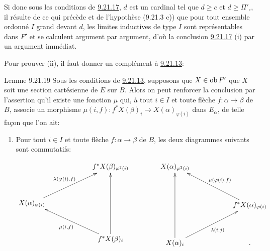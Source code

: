 \documentclass[10pt]{../fichiers-configuration-latex/smfart}
\def\labelenumi{(\theenumi)}
\begin{document}
Si donc sous les conditions de \hyperref[I.lem9.21.17]{9.21.17}, $d$ est un cardinal tel que
$d\geq c$ et $d\geq \Pi'_{\circ}$, il résulte de ce qui précède et
de l'hypothèse (9.21.3 c)) que pour tout ensemble
ordonné $I$ grand
devant $d$, les limites inductives de type $I$ sont représentables
dans $F'$ et se calculent argument par argument, d'où la conclusion
\hyperref[I.lem9.21.17]{9.21.17} (i) par un argument immédiat.

Pour prouver (ii), il faut donner un complément à \hyperref[I.lem9.21.13]{9.21.13}:

\begin{enonce*}{Lemme 9.21.19}
Sous les conditions de \hyperref[I.lem9.21.13]{9.21.13}, supposons que $X\in \operatorname{ob} F'$ \ie
que $X$ soit une section cartésienne de $E$ sur $B$. Alors on peut
renforcer la conclusion par l'assertion qu'il existe une fonction
$μ$ qui, à tout $i\in I$ et toute flèche $f:\alpha\rightarrow
\beta$ de $B$, associe un morphisme $μ(i,f):f^\ast
X(\beta)_i\rightarrow X(\alpha)_{\varphi(i)}$ dans $E_{\alpha}$, de
telle façon que l'on ait:

\begin{enumerate}
\renewcommand{\theenumi}{\alph{enumi}}
\renewcommand{\labelenumi}{\theenumi)}
\setcounter{enumi}{3}
\item Pour tout $i\in I$ et toute flèche $f:\alpha\rightarrow \beta$
de $B$, les deux diagrammes suivants sont commutatifs:

\begin{displaymath}
\xymatrix@L=5pt@R=1.25cm@C=2.2cm{
                       & f^{\ast}X(\beta)_{\varphi^{2}(i)}\\
X(\alpha)_{\varphi(i)}\ar[ru]^{\lambda(\varphi (i),f)} &\\
                       & f^{\ast}X(\beta)_i \ar[lu]^{\mu(i,f)}\ar[uu]
} \qquad\qquad \xymatrix@L=5pt@R=1.35cm@C=2cm{
X(\alpha)_{\varphi^2(i)} & \\
                         & f^{\ast}X(\alpha)_{\varphi(i)} \ar[lu]_{\mu(\varphi(i),f)}\\
X(\alpha)_i \ar[uu]\ar[ru]_{\lambda(i,j)}             &. }
\end{displaymath}
\end{enumerate}
\end{enonce*}
\end{document}
